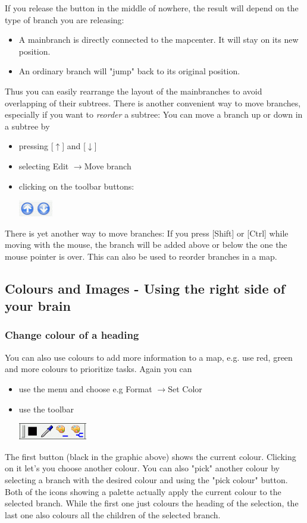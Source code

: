 \documentclass[12pt,a4paper]{article}
\newcommand{\ra}{$\longrightarrow$}
\newcommand{\ua}{$\uparrow$}
\newcommand{\da}{$\downarrow$}
\newcommand{\key}[1]{[#1]}
\begin{document}
If you release the button in the middle of nowhere, the result will
depend on the type of branch you are releasing:
\begin{itemize}
    \item A mainbranch is directly connected to the mapcenter.
        It will stay on its new position.
    \item An ordinary branch will "jump" back to its original position. 
\end{itemize}
Thus you can easily rearrange the layout of the mainbranches to avoid
overlapping of their subtrees.
There is another convenient way to move branches, especially if you want
to {\em reorder} a subtree: You can move a branch up or down in a
subtree by
\begin{itemize}
    \item pressing \key{\ua} and \key {\da}
    \item selecting Edit \ra Move branch
    \item clicking on the toolbar buttons:
        \begin{center}
            \includegraphics[width=1.5cm]{images/move-buttons.png}
        \end{center}    
\end{itemize}
There is yet another way to move branches: If you press \key{Shift} or
\key{Ctrl} while moving with the mouse, the branch will be added above
or below the one the mouse pointer is over. This can also be used to reorder branches in a map.

\subsection{Colours and Images - Using the right side of your brain}
\subsubsection*{Change colour of a heading}
You can also use colours to add more information to a map, e.g. use
red, green and more colours to prioritize tasks. Again you can
\begin{itemize}
    \item use the menu and choose e.g Format \ra Set Color
    \item use the toolbar
        \begin{center}
            \includegraphics[width=3cm]{images/color-buttons.png}
        \end{center}    
\end{itemize}
The first button (black in the graphic above) shows the current colour.
Clicking on it let's you choose another colour. You can also "pick"
another colour by selecting a branch with the desired colour and using the
"pick colour" button. Both of the icons showing a palette actually apply
the current colour to the selected branch. While the first one just
colours the heading of the selection, the last one also colours all the
children of the selected branch.
\end{document}
